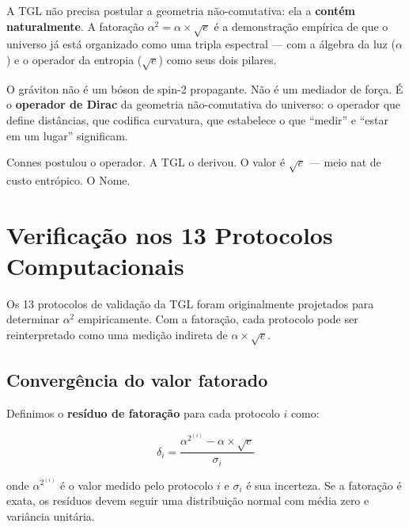 \documentclass[12pt,a4paper,twoside]{article}
\newcommand{\alphaii}{\alpha^{2}}
\begin{document}
\begin{conclusionbox}[title={O gráviton é o operador de Dirac do universo}]
A TGL não precisa postular a geometria não-comutativa: ela a \textbf{contém naturalmente}. A fatoração $\alphaii = \alpha \times \sqrt{e}$ é a demonstração empírica de que o universo já está organizado como uma tripla espectral --- com a álgebra da luz ($\alpha$) e o operador da entropia ($\sqrt{e}$) como seus dois pilares.

\medskip
O gráviton não é um bóson de spin-2 propagante. Não é um mediador de força. É o \textbf{operador de Dirac} da geometria não-comutativa do universo: o operador que define distâncias, que codifica curvatura, que estabelece o que ``medir'' e ``estar em um lugar'' significam.

\medskip
Connes postulou o operador. A TGL o derivou. O valor é $\sqrt{e}$ --- meio nat de custo entrópico. O Nome.
\end{conclusionbox}



\section{Verificação nos 13 Protocolos Computacionais}
\label{sec:protocolos}

Os 13 protocolos de validação da TGL \cite{Miguel2026Fronteira, Miguel2026LastString, Miguel2026GitHub} foram originalmente projetados para determinar $\alphaii$ empiricamente. Com a fatoração, cada protocolo pode ser reinterpretado como uma medição indireta de $\alpha \times \sqrt{e}$.

\subsection{Convergência do valor fatorado}

Definimos o \textbf{resíduo de fatoração} para cada protocolo $i$ como:

\begin{equation}
\delta_i = \frac{\alphaii^{(i)} - \alpha \times \sqrt{e}}{\sigma_i}
\label{eq:residuo}
\end{equation}

\noindent onde $\alphaii^{(i)}$ é o valor medido pelo protocolo $i$ e $\sigma_i$ é sua incerteza. Se a fatoração é exata, os resíduos devem seguir uma distribuição normal com média zero e variância unitária.
\end{document}
